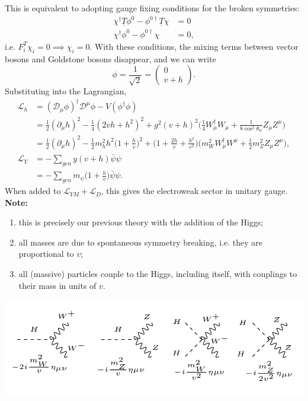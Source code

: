 \documentclass[a4paper,12pt]{article}
\begin{document}
This is equivalent to adopting gauge fixing conditions for the broken symmetries:
\begin{equation}
\begin{split}
\chi^\dagger \underline{T} \phi^0 - \phi^{0 \dagger} \underline{T} \chi &= 0 \\
\chi^\dagger \phi^0 - \phi^{0 \dagger} \chi &= 0,
\end{split}
\end{equation}
i.e. $F_i^T\chi_i=0 \implies \chi_i=0$. With these conditions, the mixing terms between vector bosons and Goldstone bosons disappear, and we can write
\[\phi = \frac{1}{\sqrt{2}} = \left( \begin{array}{cc}
0   \\
v + h  \end{array} \right). \]
Substituting into the Lagrangian, 
\begin{equation}
\begin{split}
\mathcal{L}_h &= (\mathcal{D}_\mu \phi)^\dagger \mathcal{D}^\mu \phi - V(\phi^\dagger \phi) \\
&= \frac{1}{2}(\partial_\mu h)^2 - \frac{1}{4}(2vh + h^2)^2 + g^2(v+h)^2 \bigg(\frac{1}{4} W_\mu^\dagger W_\mu + \frac{1}{8\cos^2\theta_w} Z_\mu Z^\mu \bigg) \\
&= \frac{1}{2}(\partial_\mu h)^2 -\frac{1}{2}m_h^2h^2\bigg(1 + \frac{h}{v}\bigg)^2 + \bigg(1+ \frac{2h}{v} + \frac{h^2}{v^2}\bigg)\bigg(m_W^2 W_\mu^\dagger W^\mu + \frac{1}{2}m_Z^2 Z_\mu Z^\mu\bigg), \\
\mathcal{L}_Y &= -\sum_{gen} y(v+h)\bar{\psi}\psi \\
&= -\sum_{gen} m_\psi \bigg(1 +\frac{h}{v}\bigg)\bar{\psi}\psi.
\end{split}
\end{equation}
When added to $\mathcal{L}_{YM} + \mathcal{L}_D$, this gives the electroweak sector in unitary gauge.
\textbf{Note:}
\begin{enumerate}
\item this is precisely our previous theory with the addition of the Higgs;
\item all masses are due to spontaneous symmetry breaking, i.e. they are proportional to $v$;
\item all (massive) particles couple to the Higgs, including itself, with couplings to their mass in units of $v$.
\end{enumerate}
  \includegraphics[width=\linewidth]{figs/31a.png}
\end{document}
